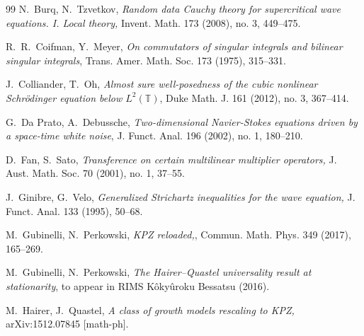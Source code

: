 \documentclass[letterpaper, 11pt,  reqno]{amsart}
\newcommand{\1}{\hspace{0.5mm}\text{I}\hspace{0.5mm}}
\newcommand{\T}{\mathbb{T}}
\numberwithin{equation}{section}
\numberwithin{theorem}{section}
\begin{document}
\begin{thebibliography}{99}
N.~Burq, N.~Tzvetkov,
{\it Random data Cauchy theory for supercritical wave equations. I. Local theory,}
Invent. Math. 173 (2008), no. 3, 449--475.




R.~R.~Coifman,  Y.~Meyer,
{\it On commutators of singular integrals and bilinear singular
              integrals}, Trans. Amer. Math. Soc. 173 (1975), 315--331.
 

J.~Colliander, T.~Oh, {\it  Almost sure well-posedness of the cubic nonlinear Schr\"odinger equation below $L^2(\T)$}, Duke Math. J. 161 (2012), no. 3, 367--414. 





G.~Da Prato, A.~Debussche, 
{\it Two-dimensional Navier-Stokes equations driven by a space-time white noise}, 
J. Funct. Anal. 196 (2002), no. 1, 180--210.



D.~Fan, S.~Sato, {\it Transference on certain multilinear multiplier operators,}
 J. Aust. Math. Soc. 70 (2001), no. 1, 37--55.





J.~Ginibre, G.~Velo, 
{\it Generalized Strichartz inequalities for the wave equation,} J. Funct. Anal. 133 (1995),
50--68.



M.~Gubinelli, N.~Perkowski, 
{\it   KPZ reloaded,},
Commun. Math. Phys. 349 (2017), 165--269.


M.~Gubinelli, N.~Perkowski, 
{\it The Hairer--Quastel universality result at stationarity}, 
 to appear in RIMS K\^oky\^uroku Bessatsu (2016).


M.~Hairer, J.~Quastel,
{\it A class of growth models rescaling to KPZ,}
arXiv:1512.07845 [math-ph].


\end{thebibliography}
\end{document}

